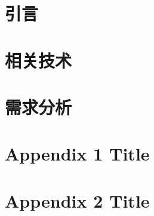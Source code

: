 \renewcommand{\abstractname}{\fontsize{18pt}{27pt}\selectfont\heiti{摘\hspace{2em}要}}
\begin{abstract}
    
\end{abstract}

\newpage

\renewcommand{\abstractname}{\fontsize{18pt}{27pt}\selectfont{Abstract}}
\begin{abstract}
    
\end{abstract}



\tableofcontents
\newpage

\chapter{引言}


\chapter{相关技术}


\chapter{需求分析}


\appendix
\chapter{Appendix 1 Title}


\chapter{Appendix 2 Title}


\newpage




